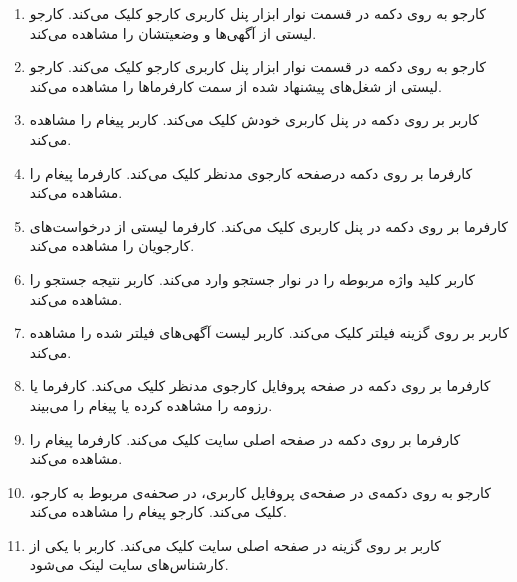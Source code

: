 \begin{enumerate}
	\item[] \label{uc:see-reqs}
	\tuc		
	{کارجو به روی دکمه‌  در قسمت نوار ابزار پنل کاربری کارجو کلیک می‌کند.}
	{کارجو لیستی از آگهی‌ها و وضعیتشان را مشاهده می‌کند.}
	
	\item[] 
	\tuc		
	{کارجو به روی دکمه‌  در قسمت نوار ابزار پنل کاربری کارجو کلیک می‌کند.}
	{کارجو لیستی از شغل‌های پیشنهاد شده از سمت کارفرماها را مشاهده می‌کند.}
	
	\item[] 
	\tuc				
	{کاربر بر روی دکمه  در پنل کاربری خودش کلیک می‌کند.}
	{کاربر پیغام  را مشاهده می‌کند.}
	
	\item[] 
	\tuc				
	{کارفرما بر روی دکمه  درصفحه کارجوی مدنظر کلیک می‌کند.}
	{کارفرما پیغام  را مشاهده می‌کند.}
	
	\item[] \label{uc:req-manage}
	\tuc				
	{کارفرما بر روی دکمه  در پنل کاربری کلیک می‌کند.}
	{کارفرما لیستی از درخواست‌های کارجویان را مشاهده می‌کند.}
	
	\item[] \label{uc:apply-search}
	\tuc				
	{کاربر کلید واژه مربوطه را در نوار جستجو وارد می‌کند.}
	{کاربر نتیجه جستجو را مشاهده می‌کند.}
	
	\item[] 
	\tuc				
	{کاربر بر روی گزینه فیلتر کلیک می‌کند.}
	{کاربر لیست آگهی‌های فیلتر شده را مشاهده می‌کند.}
	
	\item[] \label{uc:see-resumes}
	\tuc				
	{کارفرما بر روی دکمه  در صفحه پروفایل کارجوی مدنظر کلیک می‌کند.}
	{کارفرما یا رزومه را مشاهده کرده یا پیغام  را می‌بیند.}
	
	\item[] 
	\tuc				
	{کارفرما بر روی دکمه  در صفحه اصلی سایت کلیک می‌کند.}
	{کارفرما پیغام  را مشاهده می‌کند.}
	
	\item[] 
	\tuc				
	{کارجو به روی دکمه‌ی  در صفحه‌ی پروفایل کاربری، در صحفه‌ی مربوط به کارجو، کلیک می‌کند.}
	{کارجو پیغام  را مشاهده می‌کند.}
	
	\item[] 
	\tuc				
	{کاربر بر روی گزینه  در صفحه اصلی سایت کلیک می‌کند.}
	{کاربر با یکی از کارشناس‌های سایت لینک می‌شود.}
	
	\renewcommand{\labelenumi}{\arabic{enumi})}
\end{enumerate}

